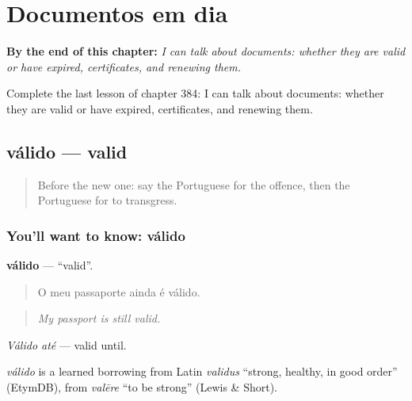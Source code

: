 
\chapter{Documentos em dia}
\label{ch:pt-documentos-em-dia}

\begin{chapteropening}
\textbf{By the end of this chapter:} \emph{I can talk about documents: whether they are valid or have expired, certificates, and renewing them.}

Complete the last lesson of chapter 384: I can talk about documents: whether they are valid or have expired, certificates, and renewing them.
\end{chapteropening}

\section[válido]{válido — valid}

\label{lesson:PT-C384-valido}



\begin{quote}
Before the new one: say the Portuguese for the offence, then the Portuguese for to transgress.
\end{quote}

\subsection*{You'll want to know: válido}
\textbf{válido} — \textquotedblleft{}valid\textquotedblright{}.

\begin{quote}
O meu passaporte ainda é válido.
\end{quote}

\begin{quote}
\emph{My passport is still valid.}
\end{quote}

\emph{Válido até} — valid until.

\begin{cousinweb}
\emph{válido} is a learned borrowing from Latin \emph{validus} \textquotedblleft{}strong, healthy, in good order\textquotedblright{} (EtymDB), from \emph{valēre} \textquotedblleft{}to be strong\textquotedblright{} (Lewis \& Short).
\end{cousinweb}

